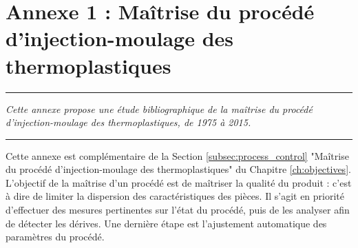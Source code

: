 
\appendix
\renewcommand\chaptername{Annexe~}

\lhead[\fancyplain{}{\leftmark}]%
      {\fancyplain{}{}} %
\chead[\fancyplain{}{}]%
      {\fancyplain{}{}}
\rhead[\fancyplain{}{}]%
      {\fancyplain{}{\rightmark}}%
\lfoot[\fancyplain{}{}]%
      {\fancyplain{}{}}
\cfoot[\fancyplain{}{\thepage}]%
      {\fancyplain{}{\thepage}} %
\rfoot[\fancyplain{}{}]%
     {\fancyplain{}{\scriptsize}}



\chapter{Annexe 1 : Maîtrise du procédé d'injection-moulage des thermoplastiques}
\label{Ann:process_control}


\begin{center}
\rule{0.7\linewidth}{.5pt}
\begin{minipage}{0.7\linewidth}
\smallskip

\textit{
Cette annexe propose une étude bibliographique de la maîtrise du procédé d'injection-moulage des thermoplastiques, de 1975 à 2015.
}

\end{minipage}
\smallskip
\rule{0.7\linewidth}{.5pt}
\end{center}

\minitoc
\bigskip

Cette annexe est complémentaire de la Section \ref{subsec:process_control} "Maîtrise du procédé d'injection-moulage des thermoplastiques" du Chapitre \ref{ch:objectives}.
L'objectif de la maîtrise d'un procédé est de maîtriser la qualité du produit : c'est à dire de limiter la dispersion des caractéristiques des pièces.
Il s'agit en priorité d'effectuer des mesures pertinentes sur l'état du procédé, puis de les analyser afin de détecter les dérives.
Une dernière étape est l'ajustement automatique des paramètres du procédé.

